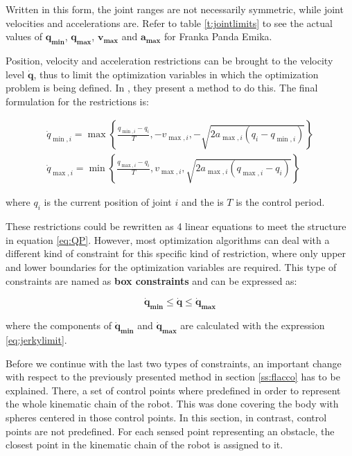 Written in this form, the joint ranges are not necessarily symmetric, while joint velocities and accelerations are. Refer to table \ref{t:jointlimits} to see the actual values of $\mathbf{q_{\min}}$, $\mathbf{q_{\max}}$, $\mathbf{v_{\max}}$ and $\mathbf{a_{\max}}$ for Franka Panda Emika.

Position, velocity and acceleration restrictions can be brought to the velocity level $\dot{\mathbf{q}}$, thus to limit the optimization variables in which the optimization problem is being defined. In \cite{flacco2012motion}, they present a method to do this. The final formulation for the restrictions is:

\begin{equation}
    \label{eq:jerkylimit}
    \begin{array}{l}
        \dot{q}_{\min , i}=\max \left\{\frac{q_{\min , i}-q_{i}}{T},-v_{\max , i},-\sqrt{2 a_{\max , i}\left(q_{i}-q_{\min , i}\right)}\right\} \\
        \dot{q}_{\max , i}=\min \left\{\frac{q_{\max, i}-q_{i}}{T}, v_{\max , i}, \sqrt{2 a_{\max , i}\left(q_{\max , i}-q_{i}\right)}\right\}
    \end{array}
\end{equation}


where $q_{i}$ is the current position of joint $i$ and the is $T$ is the control period.

These restrictions could be rewritten as 4 linear equations to meet the structure in equation \ref{eq:QP}. However, most optimization algorithms can deal with a different kind of constraint for this specific kind of restriction, where only upper and lower boundaries for the optimization variables are required. This type of constraints are named as \textbf{box constraints} and can be expressed as:

$$
\mathbf{\dot{q}_{\min}} \leq \mathbf{\dot{q}} \leq \mathbf{\dot{q}_{\max}}
$$

where the components of $\mathbf{\dot{q}_{\min}}$ and $\mathbf{\dot{q}_{\max}}$ are calculated with the expression \ref{eq:jerkylimit}.

Before we continue with the last two types of constraints, an important change with respect to the previously presented method in section \ref{ss:flacco} has to be explained. There, a set of control points where predefined in order to represent the whole kinematic chain of the robot. This was done covering the body with spheres centered in those control points. In this section, in contrast, control points are not predefined. For each sensed point representing an obstacle, the closest point in the kinematic chain of the robot is assigned to it.


